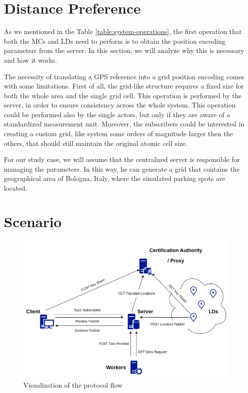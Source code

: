 \section{Distance Preference}

As we mentioned in the Table \ref{table:system-operations}, the first operation that both the MCs and LDs need to perform is to obtain the position encoding parameters from the server. In this section, we will analyze why this is necessary and how it works.

The necessity of translating a GPS reference into a grid position encoding comes with some limitations. First of all, the grid-like structure requires a fixed size for both the whole area and the single grid cell. This operation is performed by the server, in order to ensure consistency across the whole system. This operation could be performed also by the single actors, but only if they are aware of a standardized measurement unit. Moreover, the subscribers could be interested in creating a custom grid, like system some orders of magnitude larger then the others, that should still maintain the original atomic cell size.

For our study case, we will assume that the centralized server is responsible for managing the parameters. In this way, he can generate a grid that contains the geographical area of Bologna, Italy, where the simulated parking spots are located.

\section{Scenario}


\begin{figure}[h]
    \centering
    \includegraphics[width=12cm,height=7.5cm]{img/workflow.png}
    \caption{Visualization of the protocol flow}
    \label{fig:protocol-flow}
\end{figure}

